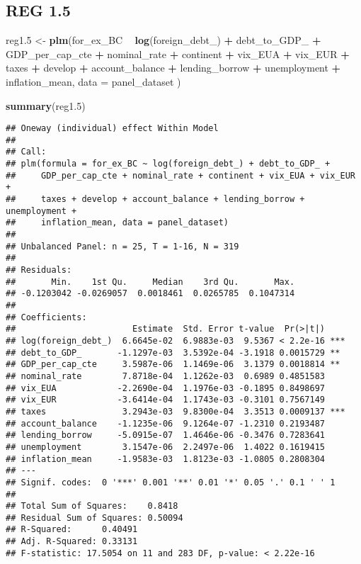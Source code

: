 \documentclass[]{article}
\newenvironment{Shaded}{\begin{snugshade}}{\end{snugshade}}
\newcommand{\KeywordTok}[1]{\textcolor[rgb]{0.13,0.29,0.53}{\textbf{#1}}}
\newcommand{\DataTypeTok}[1]{\textcolor[rgb]{0.13,0.29,0.53}{#1}}
\newcommand{\DecValTok}[1]{\textcolor[rgb]{0.00,0.00,0.81}{#1}}
\newcommand{\StringTok}[1]{\textcolor[rgb]{0.31,0.60,0.02}{#1}}
\newcommand{\OperatorTok}[1]{\textcolor[rgb]{0.81,0.36,0.00}{\textbf{#1}}}
\newcommand{\NormalTok}[1]{#1}
\begin{document}
\subsection{REG 1.5}\label{reg-1.5}

\begin{Shaded}
\begin{Highlighting}[]
\NormalTok{reg1.}\DecValTok{5}\NormalTok{ <-}\StringTok{ }\KeywordTok{plm}\NormalTok{(for_ex_BC }\OperatorTok{~}\StringTok{ }\KeywordTok{log}\NormalTok{(foreign_debt_) }\OperatorTok{+}\StringTok{ }\NormalTok{debt_to_GDP_ }\OperatorTok{+}\StringTok{ }\NormalTok{GDP_per_cap_cte }\OperatorTok{+}\StringTok{ }\NormalTok{nominal_rate }\OperatorTok{+}\StringTok{ }\NormalTok{continent }\OperatorTok{+}\StringTok{ }\NormalTok{vix_EUA }\OperatorTok{+}\StringTok{ }\NormalTok{vix_EUR }\OperatorTok{+}\StringTok{ }\NormalTok{taxes }\OperatorTok{+}\StringTok{ }\NormalTok{develop }\OperatorTok{+}\StringTok{ }\NormalTok{account_balance }\OperatorTok{+}\StringTok{ }\NormalTok{lending_borrow }\OperatorTok{+}\StringTok{ }\NormalTok{unemployment }\OperatorTok{+}\StringTok{ }\NormalTok{inflation_mean, }\DataTypeTok{data =}\NormalTok{ panel_dataset )}

\KeywordTok{summary}\NormalTok{(reg1.}\DecValTok{5}\NormalTok{)}
\end{Highlighting}
\end{Shaded}

\begin{verbatim}
## Oneway (individual) effect Within Model
## 
## Call:
## plm(formula = for_ex_BC ~ log(foreign_debt_) + debt_to_GDP_ + 
##     GDP_per_cap_cte + nominal_rate + continent + vix_EUA + vix_EUR + 
##     taxes + develop + account_balance + lending_borrow + unemployment + 
##     inflation_mean, data = panel_dataset)
## 
## Unbalanced Panel: n = 25, T = 1-16, N = 319
## 
## Residuals:
##       Min.    1st Qu.     Median    3rd Qu.       Max. 
## -0.1203042 -0.0269057  0.0018461  0.0265785  0.1047314 
## 
## Coefficients:
##                       Estimate  Std. Error t-value  Pr(>|t|)    
## log(foreign_debt_)  6.6645e-02  6.9883e-03  9.5367 < 2.2e-16 ***
## debt_to_GDP_       -1.1297e-03  3.5392e-04 -3.1918 0.0015729 ** 
## GDP_per_cap_cte     3.5987e-06  1.1469e-06  3.1379 0.0018814 ** 
## nominal_rate        7.8718e-04  1.1262e-03  0.6989 0.4851583    
## vix_EUA            -2.2690e-04  1.1976e-03 -0.1895 0.8498697    
## vix_EUR            -3.6414e-04  1.1743e-03 -0.3101 0.7567149    
## taxes               3.2943e-03  9.8300e-04  3.3513 0.0009137 ***
## account_balance    -1.1235e-06  9.1264e-07 -1.2310 0.2193487    
## lending_borrow     -5.0915e-07  1.4646e-06 -0.3476 0.7283641    
## unemployment        3.1547e-06  2.2497e-06  1.4022 0.1619415    
## inflation_mean     -1.9583e-03  1.8123e-03 -1.0805 0.2808304    
## ---
## Signif. codes:  0 '***' 0.001 '**' 0.01 '*' 0.05 '.' 0.1 ' ' 1
## 
## Total Sum of Squares:    0.8418
## Residual Sum of Squares: 0.50094
## R-Squared:      0.40491
## Adj. R-Squared: 0.33131
## F-statistic: 17.5054 on 11 and 283 DF, p-value: < 2.22e-16
\end{verbatim}
\end{document}
